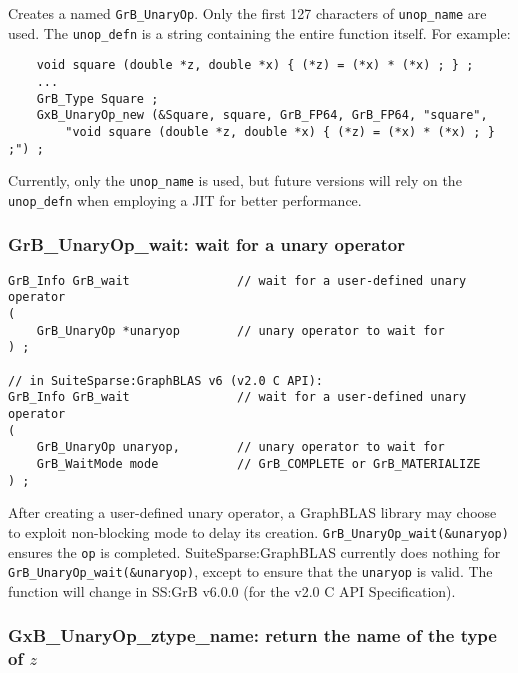 \documentclass[12pt]{article}
\begin{document}
Creates a named \verb'GrB_UnaryOp'.  Only the first 127 characters of
\verb'unop_name' are used.  The \verb'unop_defn' is a string containing the
entire function itself.  For example:

    {\footnotesize
    \begin{verbatim}
    void square (double *z, double *x) { (*z) = (*x) * (*x) ; } ;
    ...
    GrB_Type Square ;
    GxB_UnaryOp_new (&Square, square, GrB_FP64, GrB_FP64, "square",
        "void square (double *z, double *x) { (*z) = (*x) * (*x) ; } ;") ;
    \end{verbatim}}

Currently, only the \verb'unop_name' is used, but future versions will
rely on the \verb'unop_defn' when employing a JIT for better performance.

\newpage
\subsubsection{{\sf GrB\_UnaryOp\_wait:} wait for a unary operator}
\label{unaryop_wait}

\begin{mdframed}[userdefinedwidth=6in]
{\footnotesize
\begin{verbatim}
GrB_Info GrB_wait               // wait for a user-defined unary operator
(
    GrB_UnaryOp *unaryop        // unary operator to wait for
) ;

// in SuiteSparse:GraphBLAS v6 (v2.0 C API):
GrB_Info GrB_wait               // wait for a user-defined unary operator
(
    GrB_UnaryOp unaryop,        // unary operator to wait for
    GrB_WaitMode mode           // GrB_COMPLETE or GrB_MATERIALIZE
) ;
\end{verbatim}
}\end{mdframed}

After creating a user-defined unary operator, a GraphBLAS library may choose to
exploit non-blocking mode to delay its creation.
\verb'GrB_UnaryOp_wait(&unaryop)' ensures the \verb'op' is completed.
SuiteSparse:GraphBLAS currently does nothing for
\verb'GrB_UnaryOp_wait(&unaryop)', except to ensure that the \verb'unaryop' is
valid.
The function will change in SS:GrB v6.0.0 (for the v2.0 C API Specification).

\subsubsection{{\sf GxB\_UnaryOp\_ztype\_name:} return the name of the type of $z$}
\label{unaryop_ztype_name}
\end{document}
